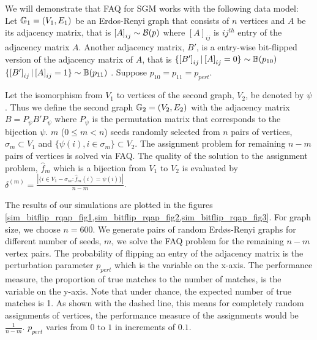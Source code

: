 \documentclass[12pt,oneside,final]{thesis}\usepackage[]{graphicx}\usepackage[]{color}
\begin{document}
We will demonstrate that  FAQ for SGM works with the following data model:
Let $\mathbb{G}_1=(V_1,E_1)$ be an Erdos-Renyi graph that consists of $n$ vertices and $A$ be its adjacency matrix,  that is
  $\left[A\right]_{ij} \sim \mathcal{B}(p)$ where $\left[A\right]_{ij}$ is ${ij}^{th}$ entry of the adjacency matrix  $A$. Another adjacency matrix, $B'$, is a entry-wise bit-flipped version of the adjacency matrix of $A$, that is
    $\{\left[B' \right]_{ij}|\left[A\right]_{ij}=0 \} \sim \mathbb{B}(p_{10})$ $\{\left[B'\right]_{ij}|\left[A\right]_{ij}=1 \} \sim \mathbb{B}(p_{11})$  . Suppose $p_{10}=p_{11}=p_{pert}$.
    
    Let the isomorphism from  $V_1$ to vertices of the second graph, $V_2$, be denoted by $\psi$. Thus we define the second graph $\mathbb{G}_2=(V_2,E_2)$ with the adjacency matrix $B=P_{\psi}B'P_{\psi}$ where $P_{\psi}$ is the permutation matrix that corresponds to the bijection $\psi$. $m$ ($0\leq m<n$) seeds randomly selected from $n$ pairs of vertices, $\sigma_m \subset V_1$  and  $\{\psi(i), i \in \sigma_m \}\subset V_2 $. The assignment problem for remaining $n-m$ pairs of vertices is solved via FAQ. The quality of the solution to the assignment problem, $\hat{f}_m$ which is a bijection from  $V_1$ to  $V_2$ is evaluated  by  $\delta^{(m)} = \frac{|\{i\in V_1-\sigma_m: \hat{f}_m(i)=\psi(i)\}|}{n-m}$.
  
  The results of our simulations are plotted in the figures \ref{sim_bitflip_rqap_fig1,sim_bitflip_rqap_fig2,sim_bitflip_rqap_fig3}. For graph size, we choose $n=600$. We generate pairs of random Erd\o s-Renyi graphs  for different number of seeds, $m$, we solve the FAQ problem for the remaining $n-m$ vertex pairs. The probability of flipping an entry of the adjacency matrix is the perturbation parameter $p_{pert}$ which is the variable on the x-axis. The performance measure, the proportion of true matches to the number of matches, is the variable on the y-axis.
  Note that 
  under chance, the expected number of true matches is 1. As shown with the dashed line, this means for completely random assignments of vertices, the performance measure of the assignments would be $\frac{1}{n-m}$.  $p_{pert}$ varies from $0$ to $1$ in increments of $0.1$. 
\end{document}

